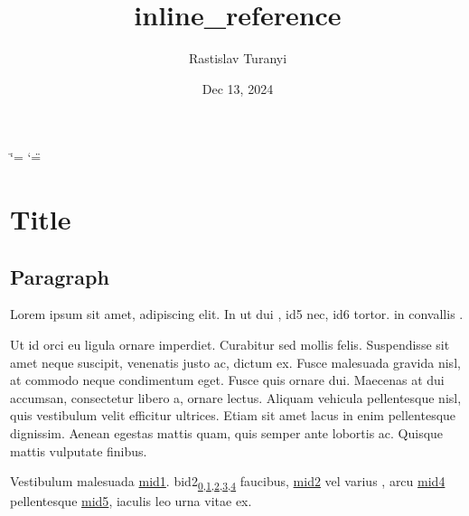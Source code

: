 \documentclass[letterpaper,10pt,english]{sphinxmanual}
\title{inline\_reference}
\date{Dec 13, 2024}
\author{Rastislav Turanyi}
\begin{document}
\ifdefined\shorthandoff
  \ifnum\catcode`\=\string=\active\shorthandoff{=}\fi
  \ifnum\catcode`\"=\active{}\fi
\fi

\pagestyle{empty}
\sphinxmaketitle
\pagestyle{plain}
\sphinxtableofcontents
\pagestyle{normal}
\label{\detokenize{index::doc}}


\sphinxstepscope


\chapter{Title}
\label{\detokenize{test:title}}\label{\detokenize{test::doc}}

\section{Paragraph}
\label{\detokenize{test:paragraph}}
\sphinxAtStartPar
Lorem ipsum \hyperlink{\detokenize{id1}}{} sit amet, \hyperlink{\detokenize{id2}}{} adipiscing elit. In ut dui
\hyperlink{\detokenize{id3}}{}, \hypertarget{\detokenize{id5}}{id5} \hyperlink{\detokenize{id4}}{} nec,
\hypertarget{\detokenize{id6}}{id6} tortor. \hyperlink{\detokenize{bid1}}{\hypertarget{\detokenize{bid1-ref4}}{}} in convallis \hyperlink{\detokenize{id1}}{}.

\sphinxAtStartPar
Ut id orci eu ligula ornare imperdiet. Curabitur sed mollis felis. Suspendisse sit amet neque
suscipit, venenatis justo ac, dictum ex. Fusce malesuada gravida nisl, at commodo neque condimentum
eget. Fusce quis ornare dui. Maecenas at dui accumsan, consectetur libero a, ornare lectus. Aliquam
vehicula pellentesque nisl, quis vestibulum velit efficitur ultrices. Etiam sit amet lacus in enim
pellentesque dignissim. Aenean egestas mattis quam, quis semper ante lobortis ac. Quisque mattis
vulputate finibus.

\sphinxAtStartPar
Vestibulum \hyperlink{\detokenize{bid2}}{\hypertarget{\detokenize{bid2-ref6}}{}} malesuada \hyperlink{\detokenize{test-mid1-id1}}{\hypertarget{\detokenize{test-mid1-id0}}{mid1}}.
\hypertarget{\detokenize{bid2}}{bid2}\texorpdfstring{\textsubscript{\hyperlink{\detokenize{bid2-ref6}}{0},\hyperlink{\detokenize{bid2-ref15}}{1},\hyperlink{\detokenize{bid2-ref21}}{2},\hyperlink{\detokenize{bid2-ref29}}{3},\hyperlink{\detokenize{bid2-ref39}}{4}}}{} faucibus, \hyperlink{\detokenize{test-mid2-id1}}{\hypertarget{\detokenize{test-mid2-id0}}{mid2}} vel varius \hyperlink{\detokenize{bid3}}{\hypertarget{\detokenize{bid3-ref7}}{}},
arcu \hyperlink{\detokenize{test-mid4-id1}}{\hypertarget{\detokenize{test-mid4-id0}}{mid4}} pellentesque \hyperlink{\detokenize{test-mid5-id1}}{\hypertarget{\detokenize{test-mid5-id0}}{mid5}},
\hyperlink{\detokenize{bid4}}{\hypertarget{\detokenize{bid4-ref8}}{}} iaculis leo urna vitae ex.
\end{document}
